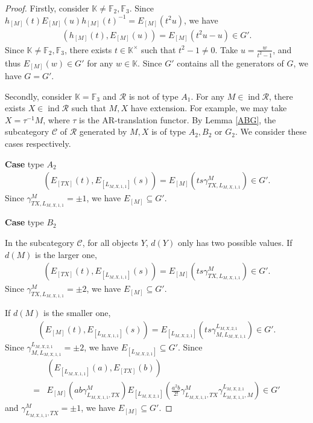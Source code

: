 \documentclass[12pt]{amsart}
\begin{document}
\begin{proof}
    Firstly, consider $\mathbb{K}\neq \mathbb{F}_2,\mathbb{F}_3$. 
    Since $h_{[M]}(t) E_{[M]}(u) h_{[M]}(t)^{-1} = E_{[M]}(t^2u)$, we have
    \begin{align*}
        (h_{[M]}(t),E_{[M]}(u)) = E_{[M]}(t^2u-u) \in G'.
    \end{align*}
    Since $\mathbb{K}\neq \mathbb{F}_2,\mathbb{F}_3$, there exists $t\in \mathbb{K}^{\times}$ such that $t^2 - 1 \neq 0$.
    Take $u=\frac{w}{t^2-1}$, and thus $E_{[M]}(w)\in G'$ for any $w\in \mathbb{K}$.
   Since $G'$ contains all the generators of $G$, we have $G=G'$.

   Secondly, consider $\mathbb{K}=\mathbb{F}_3$ and $\mathcal{R}$ is not of type $A_1$.
   For any $M\in \operatorname{ind}\mathcal{R}$, there exists $X\in \operatorname{ind}\mathcal{R}$ such that $M,X$ have extension.
   For example, we may take $X=\tau^{-1}M $, where $\tau$ is the AR-translation functor.
   By Lemma \ref{ABG}, the subcategory $\mathcal{C}$ of $\mathcal{R}$ generated by $M,X$ is of type $A_2,B_2$ or $G_2$.
   We consider these cases respectively.

   \textbf{Case} type $A_2$
   \begin{align*}
    (E_{[TX]}(t),E_{[L_{M,X,1,1}]}(s)) = E_{[M]}(ts\gamma_{TX,L_{M,X,1,1}}^{M} ) \in G'.
   \end{align*} 
   Since $\gamma_{TX,L_{M,X,1,1}}^{M} = \pm 1$, we have $E_{[M]}\subseteq  G'$.

   \textbf{Case} type $B_2$

   In the subcategory $\mathcal{C}$, for all objects $Y$, $d(Y)$ only has two possible values.
   If $d(M)$ is the larger one,
   \begin{align*}
    (E_{[TX]}(t),E_{[L_{M,X,1,1}]}(s)) = E_{[M]}(ts\gamma_{TX,L_{M,X,1,1}}^{M} ) \in G'.
   \end{align*}
   Since $\gamma_{TX,L_{M,X,1,1}}^{M} = \pm 2$, we have $E_{[M]}\subseteq  G'$.

   If $d(M)$ is the smaller one, 
   \begin{align*}
    (E_{[M]}(t),E_{[L_{M,X,1,1}]}(s)) = E_{[L_{M,X,2,1}]}(ts\gamma_{M,L_{M,X,1,1}}^{L_{M,X,2,1}} ) \in G'.
   \end{align*}
   Since $\gamma_{M,L_{M,X,1,1}}^{L_{M,X,2,1}} = \pm 2$, we have $E_{[L_{M,X,2,1}]}\subseteq  G'$.
   Since
   \begin{align*}
    &(E_{[L_{M,X,1,1}]}(a),E_{[TX]}(b)) \\
    =& E_{[M]}(ab\gamma_{L_{M,X,1,1},TX}^{M}) E_{[L_{M,X,2,1}]}(\frac{a^2b}{2!}\gamma_{L_{M,X,1,1},TX}^{M}\gamma_{L_{M,X,1,1},M}^{L_{M,X,2,1}} ) \in G'
   \end{align*}
   and $\gamma_{L_{M,X,1,1},TX}^{M} = \pm 1$, we have $E_{[M]}\subseteq  G'$.


\end{proof}
\end{document}
